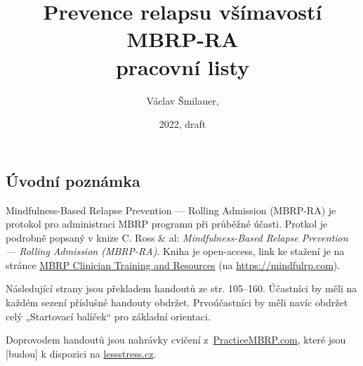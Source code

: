 \documentclass[11pt,a5paper,twoside]{article}
\title{\ifplastex\else\vskip-2cm\fi Prevence relapsu všímavostí\\ MBRP-RA \\ pracovní listy}
\date{2022, draft}
\author{Václav Šmilauer, \lessstressLogo}
\begin{document}
	\maketitle

	\subsection*{Úvodní poznámka}
		Mindfulness-Based Relapse Prevention — Rolling Admission (MBRP-RA) je protokol pro administraci MBRP programu při průběžné účasti. Protkol je podrobně popsaný v knize C. Ross \& al: \emph{Mindfulness-Based Relapse Prevention — Rolling Admission (MBRP-RA)}. Kniha je open-access, link ke stažení je na stránce \href{https://mindfulrp.com/for-clinicians}{MBRP Clinician Training and Resources} (na \url{https://mindfulrp.com}).

		Následující strany jsou překladem handoutů ze str. 105–160. Účastníci by měli na každém sezení příslušné handouty obdržet. Prvoúčastníci by měli navíc obdržet celý „Startovací balíček“ pro základní orientaci.

		Doprovodem handoutů jsou nahrávky cvičení z~\href{https://practicembrp.com}{PracticeMBRP.com}, které jsou [budou] k dispozici na \href{https://lessstress.cz}{lessstress.cz}.

	\setlength{\cftbeforesecskip}{1ex}

	\clearpage
	\tableofcontents
	
\end{document}
